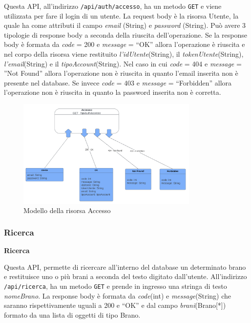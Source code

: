 \documentclass[a4paper,12pt]{article}
\begin{document}
Questa API, all’indirizzo \texttt{/api/auth/accesso}, ha un metodo \texttt{GET} e viene utilizzata per fare il login di un utente. La request body è la risorsa Utente, la quale ha come attributi il campo \textit{email} (String) e \textit{password} (String). \newline
Può avere 3 tipologie di response body a seconda della riuscita dell’operazione. \newline
Se la response body è formata da \textit{code} = 200 e \textit{message} = “OK” allora l’operazione è riuscita e nel corpo della risorsa viene restituito \textit{l’idUtente}(String), il \textit{tokenUtente}(String), \textit{l’email}(String) e il \textit{tipoAccount}(String). \newline
Nel caso in cui \textit{code} = 404  e \textit{message} = ”Not Found” allora l’operazione non è riuscita in quanto l’email inserita non è presente nel database. \newline
Se invece \textit{code} = 403 e \textit{message} = “Forbidden” allora l’operazione non è riuscita in quanto la password inserita non è corretta.

\begin{figure}[htp]
    \centering
    \includegraphics[width=0.8\textwidth]{resource-models/accesso.png}
    \caption{Modello della risorsa Accesso}
\end{figure}

\subsubsection*{Ricerca}

\textbf{Ricerca}

Questa API, permette di ricercare all’interno del database un determinato brano e restituisce uno o più brani a seconda del testo digitato dall’utente. \newline
All’indirizzo \texttt{/api/ricerca}, ha un metodo \texttt{GET} e prende in ingresso una stringa di testo \textit{nomeBrano}.
La response body è formata da \textit{code}(int) e \textit{message}(String) che saranno rispettivamente uguali a 200 e “OK” e dal campo \textit{brani}(Brano[*]) formato da una lista di oggetti di tipo Brano.
\end{document}
